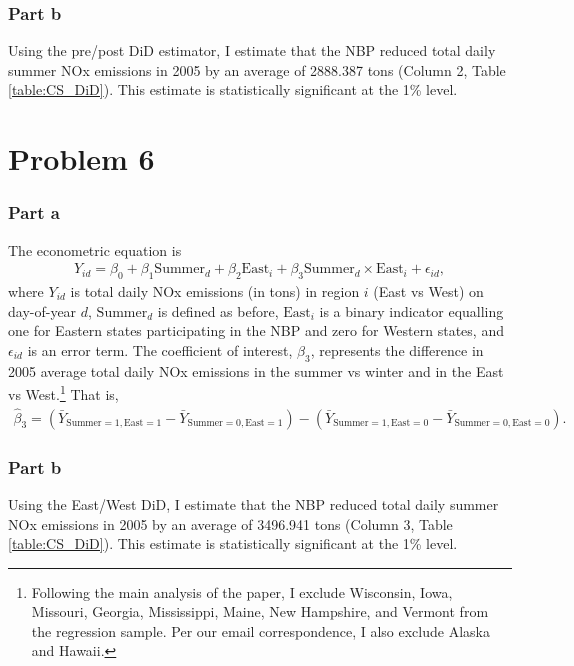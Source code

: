 \documentclass[12pt]{article}
\begin{document}
\subsubsection*{Part b}
Using the pre/post DiD estimator, I estimate that the NBP reduced total daily summer NOx emissions in 2005 by an average of 2888.387 tons (Column 2, Table \ref{table:CS_DiD}). This estimate is statistically significant at the 1\% level.

\section*{Problem 6}

\subsubsection*{Part a}
The econometric equation is
\begin{align}
	Y_{id} = \beta_0 + \beta_1 \text{Summer}_d + \beta _2 \text{East}_i + \beta_3 \text{Summer}_d \times \text{East}_i + \epsilon_{id},
\end{align}
where $Y_{id}$ is total daily NOx emissions (in tons) in region $i$ (East vs West) on day-of-year $d$, $\text{Summer}_d$ is defined as before, $\text{East}_i$ is a binary indicator equalling one for Eastern states participating in the NBP and zero for Western states, and $\epsilon_{id}$ is an error term. The coefficient of interest, $\beta_3$, represents the difference in 2005 average total daily NOx emissions in the summer vs winter and in the East vs West.\footnote{Following the main analysis of the paper, I exclude Wisconsin, Iowa, Missouri, Georgia, Mississippi, Maine, New Hampshire, and Vermont from the regression sample. Per our email correspondence, I also exclude Alaska and Hawaii.} That is,
\begin{align*}
	\hat{\beta}_3 = (\bar{Y}_{\text{Summer}=1, \text{East} = 1} -  \bar{Y}_{\text{Summer}=0, \text{East} = 1}) - (\bar{Y}_{\text{Summer}=1, \text{East} = 0} - \bar{Y}_{\text{Summer}=0, \text{East} = 0}).
\end{align*}

\subsubsection*{Part b}
Using the East/West DiD, I estimate that the NBP reduced total daily summer NOx emissions in 2005 by an average of 3496.941 tons (Column 3, Table \ref{table:CS_DiD}). This estimate is statistically significant at the 1\% level.
\end{document}
